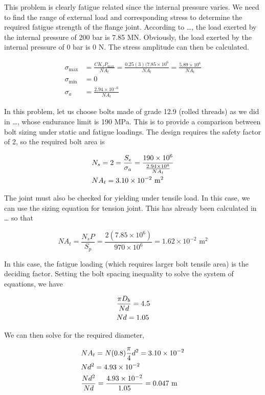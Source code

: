\documentclass[a4paper,openany,nobib]{tufte-book}
\begin{document}
{{This problem is clearly fatigue related since the internal pressure
varies. We need to find the range of external load and corresponding
stress to determine the required fatigue strength of the flange joint.
According to \ldots{}, the load exerted by the internal pressure of 200 bar is 7.85 MN.
Obviously, the load exerted by the internal pressure of 0 bar is 0 N.
The stress amplitude can then be calculated.

$$\begin{aligned}
  \sigma_{\max } &= \frac{CK_fP_{\max}}{NA_t} = \frac{0.25(3)(7.85 \times 10^6}{NA_t} = \frac{5.89 \times 10^6}{NA_t} \\ 
  \sigma_{\min } &= 0 \\ 
  \sigma_a&= \frac{2.94 \times 10^{-6}}{NA_t} \end{aligned}$$

In this problem, let us choose bolts made of grade 12.9 (rolled threads)
as we did in \ldots{}, whose endurance limit is 190 MPa. This is to provide a comparison
between bolt sizing under static and fatigue loadings. The design
requires the safety factor of 2, so the required bolt area is

$$\begin{gathered}
  N_s = 2 = \frac{S_e}{\sigma_a} = \frac{190 \times 10^6}{\frac{2.94 \times 10^6}{NA_t}} \hfill \\
  NA_t = 3.10 \times 10^{-2} \text{ m}^2 \hfill \\ 
\end{gathered}$$

The joint must also be checked for yielding under tensile load. In this
case, we can use the sizing equation for tension joint. This has already
been calculated in \ldots{} so that

$$NA_t = \frac{N_sP}{S_p} = \frac{2(7.85 \times 10^6)}{970 \times 10^6} = 1.62 \times 10^{-2} \text{ m}^2$$

In this case, the fatigue loading (which requires larger bolt tensile
area) is the deciding factor. Setting the bolt spacing inequality to
solve the system of equations, we have

$$\begin{gathered}
  \frac{\pi D_b}{Nd} = 4.5 \hfill \\
  Nd = 1.05 \hfill  \end{gathered}$$

We can then solve for the required diameter,

$$\begin{gathered}
  NA_t = N(0.8)\frac{\pi }{4}d^2 = 3.10 \times 10^{-2} \hfill \\
  Nd^2 = 4.93 \times 10^{-2} \hfill \\
  \frac{Nd^2}{Nd} = \frac{4.93 \times 10^{-2}}{1.05} = 0.047 \text{ m} \hfill\end{gathered}$$

}}
\end{document}
